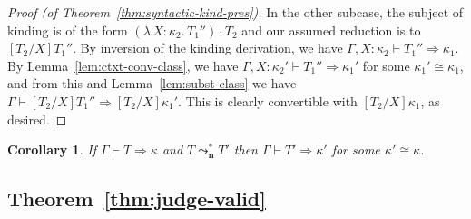 \documentclass{article}
\newcommand{\abs}[4]{{#1}\, #2\! : \! #3.\, #4}
\newcommand{\leadstocs}[0]{\ensuremath{\leadsto_{\mathbf{n}}^*}}
\newcommand{\tpsynth}[0]{\Rightarrow}
\newtheorem{corollary}[theorem]{Corollary}
\begin{document}
\begin{proof}[Proof (of Theorem~\ref{thm:syntactic-kind-pres})]
  In the other subcase, the subject of kinding is of the form
  \((\abs{\lambda}{X}{\kappa_2}{T_1''}) \cdot T_2\) and our assumed reduction is
  to \([T_2/X]T_1''\).
  By inversion of the kinding derivation, we have \(\Gamma,X:\kappa_2 \vdash
  T_1'' \tpsynth \kappa_1\).
  By Lemma~\ref{lem:ctxt-conv-class}, we have \(\Gamma,X:\kappa_2' \vdash T_1''
  \tpsynth \kappa_1'\) for some \(\kappa_1' \cong \kappa_1\), and from this and
  Lemma~\ref{lem:subst-class} we have \(\Gamma \vdash [T_2/X]T_1'' \tpsynth
  [T_2/X]\kappa_1'\).
  This is clearly convertible with \([T_2/X]\kappa_1\), as desired.
\end{proof}

\begin{corollary}
  \label{cor:syntactic-kind-pres}
  If \(\Gamma \vdash T \tpsynth \kappa\) and \(T \leadstocs T'\) then
  \(\Gamma \vdash T' \tpsynth \kappa'\) for some \(\kappa' \cong \kappa\).
\end{corollary}

\subsection{Theorem~\ref{thm:judge-valid}}
\end{document}
